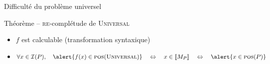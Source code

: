 \begin{frame}{Difficulté du problème universel}
\begin{block}{Théorème -- \textsc{re}-complétude de \textsc{Universal}}
    \begin{itemize}
    \item\vspace{-2mm} $f$ est calculable (transformation syntaxique)
    \item $\forall x \in \mathcal{I}(P), \quad
      \alert{f(x) \in \textsc{pos}(\textsc{Universal})}
      \quad\Leftrightarrow \quad
      x \in \llbracket M_P \rrbracket
      \quad\Leftrightarrow\quad
      \alert{x \in \textsc{pos}(P)}$
    \end{itemize}
  \end{block}

\end{frame}

\endgroup
